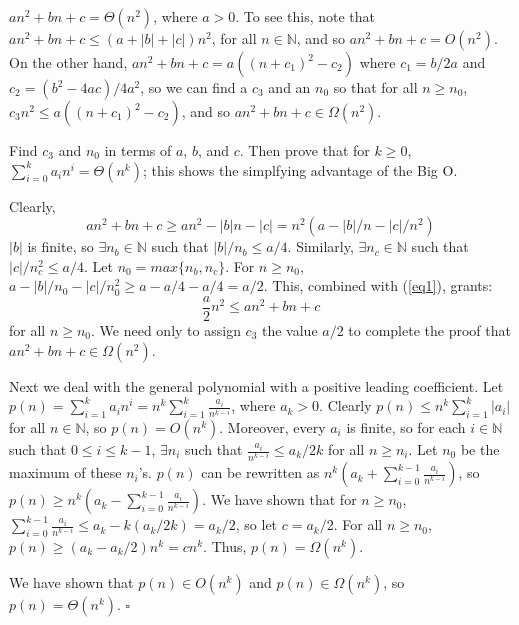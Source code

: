 \documentclass{article}
\newenvironment{prb}[1]
	{\renewcommand\theinner{#1}\inner}
	{\endinner}
\newcommand{\N}{\mathbb{N}}
\newenvironment{solution}
	{\noindent{\bf Solution:}}{\hfill$\square$}
\begin{document}
$an^2+bn+c=\Theta(n^2)$, where $a>0$. To see this, note that 
$an^2+bn+c\leq(a+|b|+|c|)n^2$, for all $n\in\N$, and so 
$an^2+bn+c=O(n^2)$. On the other hand, 
$an^2+bn+c=a((n+c_1)^2-c_2)$ where $c_1=b/2a$ and 
$c_2=(b^2-4ac)/4a^2$, so we can find a $c_3$ and an $n_0$ so that
for all $n\geq n_0$, $c_3n^2\leq a((n+c_1)^2-c_2)$, and so
$an^2+bn+c\in\Omega(n^2)$.

\begin{prb}{1.2}
Find $c_3$ and $n_0$ in terms of $a$, $b$, and $c$. Then prove that
for $k\geq0$, $\sum_{i=0}^ka_in^i=\Theta(n^k)$; this shows the 
simplfying advantage of the Big O.
\end{prb}

\begin{solution}
Clearly, 
\begin{equation}\label{eq1}
an^2+bn+c\ge an^2-|b|n-|c|=n^2(a-|b|/n-|c|/n^2)
\end{equation} 
$|b|$ is finite, so $\exists n_b\in\N$ such that $|b|/n_b\le a/4$.
Similarly, $\exists n_c\in\N$ such that $|c|/n_c^2\le a/4$.
Let $n_0=max\{n_b,n_c\}$. For $n\ge n_0$, 
$a-|b|/n_0-|c|/n_0^2\ge a-a/4-a/4=a/2$. This, combined with (\ref{eq1}),
grants:
\begin{equation}\label{eq2}
\frac{a}{2}n^2\leq an^2+bn+c
\end{equation}
for all $n\ge n_0$. We need only to assign $c_3$ the value $a/2$ to complete
the proof that $an^2+bn+c\in\Omega(n^2)$.

Next we deal with the general polynomial with a positive leading coefficient.
Let $p(n)=\sum_{i=1}^ka_in^i=n^k\sum_{i=1}^k\frac{a_i}{n^{k-i}}$, 
where $a_k>0$. Clearly $p(n)\leq n^k\sum_{i=1}^k|a_i|$ for all $n\in\N$,
so $p(n)=O(n^k)$. Moreover, every $a_i$ is finite, so for each $i\in\N$
such that $0\le i\le k-1$, $\exists n_i$ such that 
$\frac{a_i}{n^{k-i}}\le a_k/2k$ for all $n\ge n_i$. Let $n_0$ be the maximum of
these $n_i$'s. $p(n)$ can be rewritten as 
$n^k(a_k+\sum_{i=0}^{k-1}\frac{a_i}{n^{k-i}})$, so 
$p(n)\ge n^k(a_k-\sum_{i=0}^{k-1}\frac{a_i}{n^{k-i}})$.
We have shown that for $n\ge n_0$, 
$\sum_{i=0}^{k-1}\frac{a_i}{n^{k-i}}\le a_k-k(a_k/2k)=a_k/2$, so let $c=a_k/2$.
For all $n\ge n_0$, $p(n)\ge(a_k-a_k/2)n^k=cn^k$. Thus, $p(n)=\Omega(n^k)$.

We have shown that $p(n)\in O(n^k)$ and $p(n)\in\Omega(n^k)$, so 
$p(n)=\Theta(n^k)$. 
\end{solution}
\end{document}
